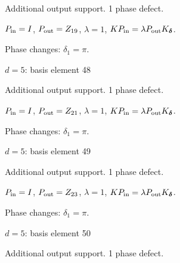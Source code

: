 Additional output support. 1 phase defect.
\begin{center}
\end{center}
\vspace{-1mm}
$P_{\rm in}=I$, \quad $P_{\rm out}=Z_{19}$, \quad $\lambda=1$, \qquad $K P_{\rm in}=\lambda P_{\rm out}K_{\boldsymbol\delta}$.
\par\smallskip\begin{minipage}{.98\linewidth}\small Phase changes: $\delta_{1}=\pi$.\end{minipage}
\vfill
{\footnotesize\texttt{}}
\newpage
{}
{\Large $d=5$: basis element 48}\par
Additional output support. 1 phase defect.
\begin{center}
\end{center}
\vspace{-1mm}
$P_{\rm in}=I$, \quad $P_{\rm out}=Z_{21}$, \quad $\lambda=1$, \qquad $K P_{\rm in}=\lambda P_{\rm out}K_{\boldsymbol\delta}$.
\par\smallskip\begin{minipage}{.98\linewidth}\small Phase changes: $\delta_{1}=\pi$.\end{minipage}
\vfill
{\footnotesize\texttt{}}
\newpage
{}
{\Large $d=5$: basis element 49}\par
Additional output support. 1 phase defect.
\begin{center}
\end{center}
\vspace{-1mm}
$P_{\rm in}=I$, \quad $P_{\rm out}=Z_{23}$, \quad $\lambda=1$, \qquad $K P_{\rm in}=\lambda P_{\rm out}K_{\boldsymbol\delta}$.
\par\smallskip\begin{minipage}{.98\linewidth}\small Phase changes: $\delta_{1}=\pi$.\end{minipage}
\vfill
{\footnotesize\texttt{}}
\newpage
{}
{\Large $d=5$: basis element 50}\par
Additional output support. 1 phase defect.
\begin{center}
\end{center}
